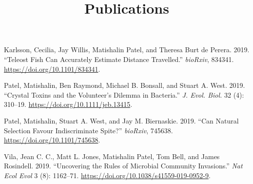 \documentclass[]{article}
\title{Publications}
\date{}
\begin{document}
\maketitle

\hypertarget{refs}{}
\leavevmode\hypertarget{ref-karlsson_teleost_2019}{}%
Karlsson, Cecilia, Jay Willis, Matishalin Patel, and Theresa Burt de
Perera. 2019. ``Teleost Fish Can Accurately Estimate Distance
Travelled.'' \emph{bioRxiv}, 834341.
\url{https://doi.org/10.1101/834341}.

\leavevmode\hypertarget{ref-patel_crystal_2019-1}{}%
Patel, Matishalin, Ben Raymond, Michael B. Bonsall, and Stuart A. West.
2019. ``Crystal Toxins and the Volunteer's Dilemma in Bacteria.''
\emph{J. Evol. Biol.} 32 (4): 310--19.
\url{https://doi.org/10.1111/jeb.13415}.

\leavevmode\hypertarget{ref-patel_can_2019}{}%
Patel, Matishalin, Stuart A. West, and Jay M. Biernaskie. 2019. ``Can
Natural Selection Favour Indiscriminate Spite?'' \emph{bioRxiv}, 745638.
\url{https://doi.org/10.1101/745638}.

\leavevmode\hypertarget{ref-vila_uncovering_2019}{}%
Vila, Jean C. C., Matt L. Jones, Matishalin Patel, Tom Bell, and James
Rosindell. 2019. ``Uncovering the Rules of Microbial Community
Invasions.'' \emph{Nat Ecol Evol} 3 (8): 1162--71.
\url{https://doi.org/10.1038/s41559-019-0952-9}.
\end{document}
